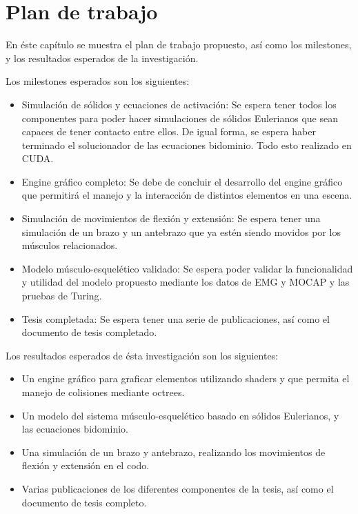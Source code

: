 \chapter{Plan de trabajo}
\label{PlanTrabajo}


En éste capítulo se muestra el plan de trabajo propuesto, así como los milestones, y los resultados esperados de la investigación.

Los milestones esperados son los siguientes:

\begin{itemize}
	\item Simulación de sólidos y ecuaciones de activación: Se espera tener todos los componentes para poder hacer simulaciones de sólidos Eulerianos que sean capaces de tener contacto entre ellos. De igual forma, se espera haber terminado el solucionador de las ecuaciones bidominio. Todo esto realizado en CUDA. 
	\item Engine gráfico completo: Se debe de concluir el desarrollo del engine gráfico que permitirá el manejo y la interacción de distintos elementos en una escena.
	\item Simulación de movimientos de flexión y extensión: Se espera tener una simulación de un brazo y un antebrazo que ya estén siendo movidos por los músculos relacionados.
	\item Modelo músculo-esquelético validado: Se espera poder validar la funcionalidad y utilidad del modelo propuesto mediante los datos de EMG y MOCAP y las pruebas de Turing.
	\item Tesis completada: Se espera tener una serie de publicaciones, así como el documento de tesis completado.
\end{itemize}

Los resultados esperados de ésta investigación son los siguientes:

\begin{itemize}
	\item Un engine gráfico para graficar elementos utilizando shaders y que permita el manejo de colisiones mediante octrees.
	\item Un modelo del sistema músculo-esquelético basado en sólidos Eulerianos, y las ecuaciones bidominio.
	\item Una simulación de un brazo y antebrazo, realizando los movimientos de flexión y extensión en el codo.
	\item Varias publicaciones de los diferentes componentes de la tesis, así como el documento de tesis completo.
\end{itemize}

